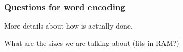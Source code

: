 	\begin{frame}[plain]
	 	\frametitle{Questions for word encoding}
		\begin{block}{}
      More details about how is actually done.
		\end{block} 
		\begin{block}{}
      What are the sizes we are talking about (fits in RAM?)
		\end{block} 
	\end{frame}
